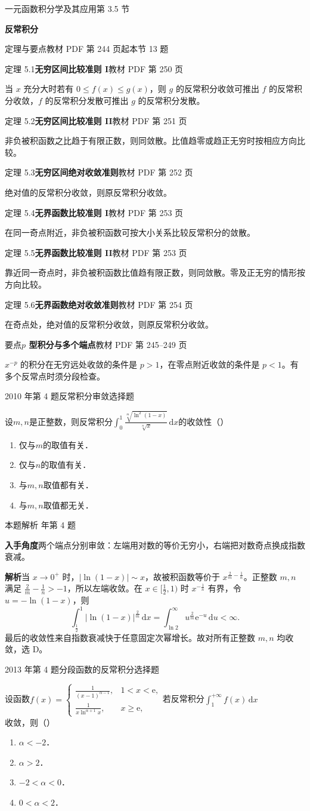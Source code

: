 \documentclass[UTF8,zihao=-4,fontset=fandol]{ctexart}
\newcommand{\SectionHeading}[4]{%
  \clearpage\hypertarget{sec-#1}{}%
  {\small\textcolor{accent}{#2\hfill 第 #1 节}}\par\medskip
  {\LARGE\bfseries #3}\par\smallskip
  {\small\textcolor{muted}{#4}}\par\bigskip}
\newcommand{\Theory}[4]{%
  {\small\textcolor{accent}{#1}\quad\textbf{#3}\hfill\textcolor{muted}{教材 PDF 第 #2 页}}\par
  {\small #4}\par\smallskip}
\newcommand{\pickout}{\hfill（\hspace{1.4em}）}
\newenvironment{abcd}{\begin{enumerate}[label=\textup{(\Alph*)},leftmargin=2.3em,itemsep=1pt,topsep=4pt,parsep=1pt]}{\end{enumerate}}
\newcommand{\QuestionPage}[6]{%
  \par\noindent\begin{minipage}{\linewidth}
  \raggedright
  {\small\textcolor{black!60}{#3\quad #5}\hfill\textcolor{accent}{#2}}\par\smallskip}
\newcommand{\QuestionEnd}{\end{minipage}\par\medskip}
\newcommand{\QuestionPage}[6]{%
  \clearpage
  {\small\textcolor{accent}{#1\hfill #2}}\par\medskip
  {\small\textcolor{black!60}{#3\quad #5\hfill #6}}\par\vspace{9bp}}
\newcommand{\QuestionEnd}{}
\newenvironment{QuestionSolution}[1]{%
  \clearpage
  {\small\textcolor{black!60}{本题解析\quad #1}}\par\medskip
}{\par\clearpage}
\begin{document}
\SectionHeading{3.5}{一元函数积分学及其应用}{反常积分}{定理与要点\quad 教材 PDF 第 244 页起\hfill 本节 13 题}
\Theory{定理 5.1}{250}{无穷区间比较准则 I}{当 \(x\) 充分大时若有 \(0\le f(x)\le g(x)\)，则 \(g\) 的反常积分收敛可推出 \(f\) 的反常积分收敛，\(f\) 的反常积分发散可推出 \(g\) 的反常积分发散。}
\Theory{定理 5.2}{251}{无穷区间比较准则 II}{非负被积函数之比趋于有限正数，则同敛散。比值趋零或趋正无穷时按相应方向比较。}
\Theory{定理 5.3}{252}{无穷区间绝对收敛准则}{绝对值的反常积分收敛，则原反常积分收敛。}
\Theory{定理 5.4}{253}{无界函数比较准则 I}{在同一奇点附近，非负被积函数可按大小关系比较反常积分的敛散。}
\Theory{定理 5.5}{253}{无界函数比较准则 II}{靠近同一奇点时，非负被积函数比值趋有限正数，则同敛散。零及正无穷的情形按方向比较。}
\Theory{定理 5.6}{254}{无界函数绝对收敛准则}{在奇点处，绝对值的反常积分收敛，则原反常积分收敛。}
\Theory{要点}{245--249}{\(p\) 型积分与多个端点}{\(x^{-p}\) 的积分在无穷远处收敛的条件是 \(p>1\)，在零点附近收敛的条件是 \(p<1\)。有多个反常点时须分段检查。}
\QuestionPage{3.5 反常积分}{选择题}{2010 年第 4 题}{1}{反常积分审敛}{189 / 234}
设$m,n$是正整数，则反常积分$\int_0^1 \frac{\sqrt[m]{\ln^2(1 - x)}}{\sqrt[n]{x}}\,\mathrm{d} x$的收敛性\pickout{}
\begin{abcd}
\item 仅与$m$的取值有关．
\item 仅与$n$的取值有关．
\item 与$m,n$取值都有关．
\item 与$m,n$取值都无关．
\end{abcd}
\QuestionEnd

\begin{QuestionSolution}{2010 年第 4 题}
\textbf{入手角度}\quad 两个端点分别审敛：左端用对数的等价无穷小，右端把对数奇点换成指数衰减。

\textbf{解析}\quad 当 \(x\to0^+\) 时，\(|\ln(1-x)|\sim x\)，故被积函数等价于 \(x^{\frac{2}{m}-\frac{1}{n}}\)。正整数 \(m,n\) 满足 \(\frac{2}{m}-\frac{1}{n}>-1\)，所以左端收敛。在 \(x\in[\frac{1}{2},1)\) 时 \(x^{-\frac{1}{n}}\) 有界，令 \(u=-\ln(1-x)\)，则
\[
\int_{\frac{1}{2}}^1|\ln(1-x)|^{\frac{2}{m}}\,\mathrm{d}x
=\int_{\ln2}^\infty u^{\frac{2}{m}}\mathrm{e}^{-u}\,\mathrm{d}u<\infty .
\]
最后的收敛性来自指数衰减快于任意固定次幂增长。故对所有正整数 \(m,n\) 均收敛，选 D。
\end{QuestionSolution}

\QuestionPage{3.5 反常积分}{选择题}{2013 年第 4 题}{1}{分段函数的反常积分}{190 / 234}
设函数$f(x) =\begin{cases}
  \frac{1}{(x - 1)^{\alpha - 1}}, & 1 < x < \mathrm{e}, \\
   \frac{1}{x\ln^{\alpha + 1} x}, & x \ge \mathrm{e},
\end{cases}$若反常积分$\int_1^{+\infty} f(x) \,\mathrm{d} x$收敛，则\pickout{}
\begin{abcd}
\item $\alpha < - 2$．
\item $\alpha > 2$．
\item $- 2 < \alpha < 0$．
\item $0 < \alpha < 2$．
\end{abcd}
\QuestionEnd
\end{document}
